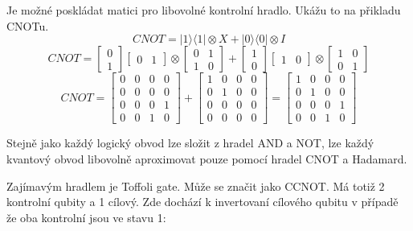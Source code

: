 \documentclass[11pt]{article}
\begin{document}
\par Je možné poskládat matici pro libovolné kontrolní hradlo. Ukážu to na přikladu CNOTu.
$$CNOT = |1 \rangle\langle 1| \otimes X + |0 \rangle\langle 0| \otimes I$$
$$CNOT = \begin{bmatrix}
        0 \\
        1
    \end{bmatrix}\begin{bmatrix}
        0 & 1
    \end{bmatrix} \otimes \begin{bmatrix}
        0 & 1 \\
        1 & 0
    \end{bmatrix} + \begin{bmatrix}
        1 \\
        0
    \end{bmatrix}\begin{bmatrix}
        1 & 0
    \end{bmatrix} \otimes \begin{bmatrix}
        1 & 0 \\
        0 & 1
    \end{bmatrix}$$
$$CNOT = \begin{bmatrix}
        0 & 0 & 0 & 0 \\
        0 & 0 & 0 & 0 \\
        0 & 0 & 0 & 1 \\
        0 & 0 & 1 & 0
    \end{bmatrix} + \begin{bmatrix}
        1 & 0 & 0 & 0 \\
        0 & 1 & 0 & 0 \\
        0 & 0 & 0 & 0 \\
        0 & 0 & 0 & 0
    \end{bmatrix} = \begin{bmatrix}
        1 & 0 & 0 & 0 \\
        0 & 1 & 0 & 0 \\
        0 & 0 & 0 & 1 \\
        0 & 0 & 1 & 0
    \end{bmatrix}$$

\par Stejně jako každý logický obvod lze složit z hradel AND a NOT, lze každý kvantový obvod libovolně aproximovat pouze pomocí hradel CNOT a Hadamard.
\par Zajímavým hradlem je Toffoli gate.
Může se značit jako CCNOT.
Má totiž 2 kontrolní qubity a 1 cílový.
Zde dochází k invertovaní cílového qubitu v případě že oba kontrolní jsou ve stavu 1:
\end{document}
